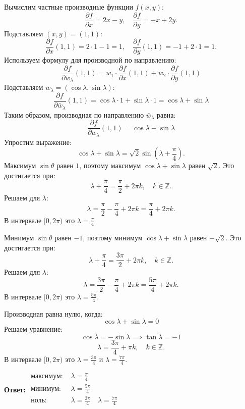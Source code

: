 \documentclass[a4paper]{article}
\begin{document}
\begin{enumerate}
    Вычислим частные производные функции \( f(x, y)\):
    \[
    \frac{\partial f}{\partial x} = 2x - y, \quad \frac{\partial f}{\partial y} =
     -x + 2y.
    \]
    Подставляем \( (x, y) = (1, 1) \):
    \[
    \frac{\partial f}{\partial x}(1, 1) = 2 \cdot 1 - 1 = 1,
     \quad \frac{\partial f}{\partial y}(1, 1) = -1 + 2 \cdot 1 = 1.
    \]
    Используем формулу для производной по направлению:
    \[
    \frac{\partial f}{\partial \bar{w}_{\lambda}}(1, 1) = 
    w_1 \cdot \frac{\partial f}{\partial x}(1, 1) + 
    w_2 \cdot \frac{\partial f}{\partial y}(1, 1)
    \]
    Подставляем \( \bar{w}_{\lambda} = (\cos \lambda, \sin \lambda) \):
    \[
    \frac{\partial f}{\partial \bar{w}_{\lambda}}(1, 1) =
     \cos \lambda \cdot 1 + \sin \lambda \cdot 1 = \cos \lambda + \sin \lambda
    \]
    Таким образом, производная по направлению \( \bar{w}_{\lambda} \) равна:
    \[
    \frac{\partial f}{\partial \bar{w}_{\lambda}}(1, 1) = \cos \lambda + \sin \lambda
    \]
    Упростим выражение:
    \[
    \cos \lambda + \sin \lambda = \sqrt{2} \sin\left( \lambda + \frac{\pi}{4} \right).
    \]
    Максимум \( \sin \theta \) равен \( 1 \), поэтому максимум 
    \( \cos \lambda + \sin \lambda \) равен \( \sqrt{2} \). Это достигается при:
    \[
    \lambda + \frac{\pi}{4} = \frac{\pi}{2} + 2\pi k, \quad k \in \mathbb{Z}.
    \]
    Решаем для \( \lambda \):
    \[
    \lambda = \frac{\pi}{2} - \frac{\pi}{4} + 2\pi k = \frac{\pi}{4} + 2\pi k.
    \]
    В интервале \( [0, 2\pi) \) это \( \lambda = \frac{\pi}{4} \)

    Минимум \( \sin \theta \) равен \( -1 \), поэтому минимум 
    \( \cos \lambda + \sin \lambda \) равен \( -\sqrt{2} \). Это достигается при:
    \[
    \lambda + \frac{\pi}{4} = \frac{3\pi}{2} + 2\pi k, \quad k \in \mathbb{Z}.
    \]
    Решаем для \( \lambda \):
    \[
    \lambda = \frac{3\pi}{2} - \frac{\pi}{4} + 2\pi k = \frac{5\pi}{4} + 2\pi k.
    \]
    В интервале \( [0, 2\pi) \) это \( \lambda = \frac{5\pi}{4} \).

    Производная равна нулю, когда:
    \[
    \cos \lambda + \sin \lambda = 0
    \]
    Решаем уравнение:
    \[
    \cos \lambda = -\sin \lambda \implies \tan \lambda = -1
    \]
    \[
    \lambda = \frac{3\pi}{4} + \pi k, \quad k \in \mathbb{Z}.
    \]
    В интервале \( [0, 2\pi) \) это \( \lambda = \frac{3\pi}{4} \)
     и \( \lambda = \frac{7\pi}{4} \).

    \textbf{Ответ: }
    $\begin{aligned}
        \text{максимум: } & \lambda = \frac{\pi}{4}\\
        \text{минимум: } & \lambda = \frac{5\pi}{4}\\
        \text{ноль: } &\lambda = \frac{3\pi}{4} \quad \lambda = \frac{7\pi}{4}\\
    \end{aligned}$\\


\end{enumerate}
\end{document}
